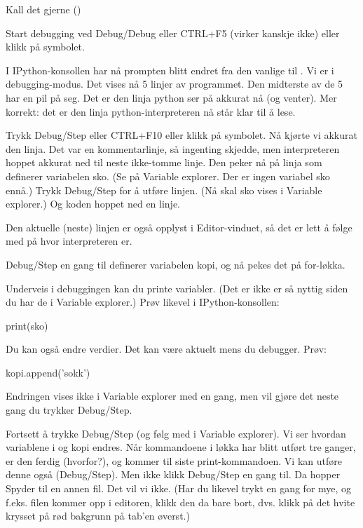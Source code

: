 Kall det gjerne  (\usnsubmenusep{})

Start debugging ved Debug/Debug eller CTRL+F5 (virker kanskje ikke) eller klikk på symbolet.

I IPython-konsollen har nå prompten blitt endret fra den vanlige  til . Vi er i debugging-modus.  Det vises nå 5 linjer av programmet. Den midterste av de 5 har en pil på seg. Det er den linja python ser på akkurat nå (og venter). Mer korrekt: det er den linja python-interpreteren nå står klar til å lese.

Trykk Debug/Step eller CTRL+F10 eller klikk på symbolet. Nå kjørte vi akkurat den linja. Det var en kommentarlinje, så ingenting skjedde, men interpreteren hoppet akkurat ned til neste ikke-tomme linje. Den peker nå på linja som definerer variabelen sko. (Se på Variable explorer. Der er ingen variabel sko ennå.) Trykk Debug/Step for å utføre linjen. (Nå skal sko vises i Variable explorer.) Og koden hoppet ned en linje.

Den aktuelle (neste) linjen er også opplyst i Editor-vinduet, så det er lett å følge med på hvor interpreteren er. 

Debug/Step en gang til definerer variabelen kopi, og nå pekes det på for-løkka.

Underveis i debuggingen kan du printe variabler. (Det er ikke er så nyttig siden du har de i Variable explorer.) Prøv likevel i IPython-konsollen:
\begin{usncodebox}
print(sko)
\end{usncodebox}

Du kan også endre verdier. Det kan være aktuelt mens du debugger. Prøv:
\begin{usncodebox}
kopi.append('sokk')
\end{usncodebox}

Endringen vises ikke i Variable explorer med en gang, men vil gjøre det neste gang du trykker Debug/Step. 

Fortsett å trykke Debug/Step (og følg med i Variable explorer). Vi ser hvordan variablene i og kopi endres. Når kommandoene i løkka har blitt utført tre ganger, er den ferdig (hvorfor?), og kommer til siste print-kommandoen. Vi kan utføre denne også (Debug/Step). Men ikke klikk Debug/Step en gang til. Da hopper Spyder til en annen fil. Det vil vi ikke. (Har du likevel trykt en gang for mye, og f.eks. filen  kommer opp i editoren, klikk den da bare bort, dvs. klikk på det hvite krysset på rød bakgrunn på tab'en øverst.)

